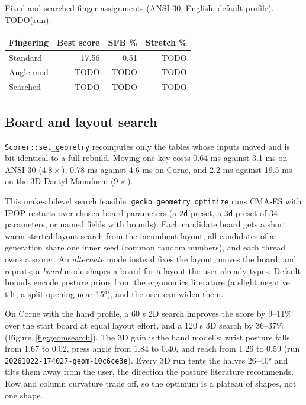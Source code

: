 \documentclass{gecko-paper}
\begin{document}
\begin{paperbody}
\begin{papertable}{Fixed and searched finger assignments (ANSI-30, English, default profile). TODO(run).\label{tab:fingers}}
\footnotesize
\begin{tabular*}{\linewidth}{@{\extracolsep{\fill}}lrrr@{}}
\toprule
Fingering & Best score & SFB \% & Stretch \%\\
\midrule
Standard & 17.56 & 0.51 & TODO\\
Angle mod & TODO & TODO & TODO\\
Searched & TODO & TODO & TODO\\
\bottomrule
\end{tabular*}
\end{papertable}

\subsection{Board and layout search}
\texttt{Scorer::set\_geometry} recomputes only the tables whose inputs moved and is bit-identical to a full rebuild. Moving one key costs 0.64 ms against 3.1 ms on ANSI-30 ($4.8\times$), 0.78 ms against 4.6 ms on Corne, and 2.2 ms against 19.5 ms on the 3D Dactyl-Manuform ($9\times$).


This makes bilevel search feasible. \texttt{gecko geometry optimize} runs CMA-ES with IPOP restarts over chosen board parameters (a \texttt{2d} preset, a \texttt{3d} preset of 34 parameters, or named fields with bounds). Each candidate board gets a short warm-started layout search from the incumbent layout, all candidates of a generation share one inner seed (common random numbers), and each thread owns a scorer. An \emph{alternate} mode instead fixes the layout, moves the board, and repeats; a \emph{board} mode shapes a board for a layout the user already types. Default bounds encode posture priors from the ergonomics literature (a slight negative tilt, a split opening near 15°), and the user can widen them.

On Corne with the hand profile, a 60 s 2D search improves the score by 9–11\% over the start board at equal layout effort, and a 120 s 3D search by 36–37\% (Figure~\ref{fig:geomsearch}). The 3D gain is the hand model's: wrist posture falls from 1.67 to 0.02, press angle from 1.84 to 0.40, and reach from 1.26 to 0.59 (run \texttt{20261022-174027-geom-10c6ce3e}). Every 3D run tents the halves 26–40° and tilts them away from the user, the direction the posture literature recommends. Row and column curvature trade off, so the optimum is a plateau of shapes, not one shape.


\end{paperbody}
\end{document}
